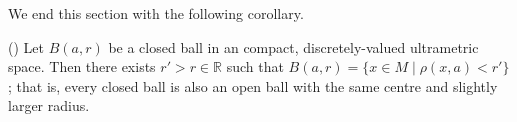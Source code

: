


We end this section with the following corollary.\\
\begin{corollary}
(\cite{ar}) Let $B(a, r)$ be a closed ball in an compact, discretely-valued ultrametric space. Then there exists $ r' > r \in \mathbb{R}$ such that $B(a, r) = \{x \in M \mid \rho(x,a) < r'\} $; that is, every closed ball is also an open ball with the same centre and  slightly larger radius.
\end{corollary}




